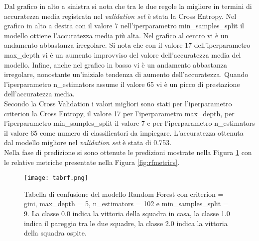 Dal grafico in alto a sinistra si nota che tra le due regole la migliore in termini di accuratezza media registrata nel \emph{validation set} è stata la Cross Entropy. Nel grafico in alto a destra con il valore 7 nell'iperparametro \textsf{min\_samples\_split} il modello ottiene l'accuratezza media più alta. Nel grafico al centro vi è un andamento abbastanza irregolare. Si nota che con il valore 17 dell'iperparametro \textsf{max\_depth} vi è un aumento improvviso del valore dell'accuratezza media del modello. Infine, anche nel grafico in basso vi è un andamento abbastanza irregolare, nonostante un'iniziale tendenza di aumento dell'accuratezza. Quando l'iperparametro \textsf{n\_estimators} assume il valore 65 vi è un picco di prestazione dell'accuratezza media.\\
Secondo la Cross Validation i valori migliori sono stati per l'iperparametro \textsf{criterion} la Cross Entropy, il valore 17 per l'iperparametro \textsf{max\_depth}, per l'iperparametro \textsf{min\_samples\_split} il valore 7 e per l'iperparametro \textsf{n\_estimators} il valore 65 come numero di classificatori da impiegare.
L'accuratezza ottenuta dal modello migliore nel \emph{validation} \emph{set} è stata di 0.753.\\
Nella fase di predizione si sono ottenute le predizioni mostrate nella Figura \ref{fig:tabrf} con le relative metriche presentate nella Figura \ref{fig:rfmetrics}.
\begin{figure}[h]
	\begin{center}
		\texttt{[image: tabrf.png]}
		\caption{Tabella di confusione del modello Random Forest con \textsf{criterion} = gini, \textsf{max\_depth} = 5, \textsf{n\_estimators} = 102 e \textsf{min\_samples\_split} = 9. La classe 0.0 indica la vittoria della squadra in casa, la classe 1.0 indica il pareggio tra le due squadre, la classe 2.0 indica la vittoria della squadra ospite.
		} 
		\label{fig:tabrf}
	\end{center}
\end{figure}

